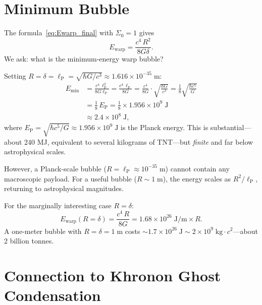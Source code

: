 \documentclass[prd,twocolumn,superscriptaddress,longbibliography]{revtex4-2}
\newcommand{\lP}{\ell_{\mathrm{P}}}
\newcommand{\Emin}{E_{\mathrm{min}}}
\newcommand{\Ewarp}{E_{\mathrm{warp}}}
\begin{document}
\section{Minimum Bubble}
\label{sec:minimum}

The formula~\eqref{eq:Ewarp_final} with $\Sigma_0 = 1$ gives
\begin{equation}
\Ewarp = \frac{c^4\,R^2}{8G\delta}.
\label{eq:Ewarp_simple}
\end{equation}
We ask: what is the minimum-energy warp bubble?

Setting $R = \delta = \lP = \sqrt{\hbar G/c^3}
\approx 1.616\times 10^{-35}\;\mathrm{m}$:
\begin{align}
\Emin &= \frac{c^4\,\lP^2}{8G\lP} = \frac{c^4\,\lP}{8G}
= \frac{c^4}{8G}\cdot\sqrt{\frac{\hbar G}{c^3}}
= \frac{1}{8}\sqrt{\frac{\hbar c^5}{G}}
\nonumber\\
&= \frac{1}{8}\,E_{\mathrm{P}}
= \frac{1}{8}\times 1.956\times 10^{9}\;\mathrm{J}
\nonumber\\
&\approx 2.4\times 10^{8}\;\mathrm{J},
\label{eq:Emin}
\end{align}
where $E_{\mathrm{P}} = \sqrt{\hbar c^5/G} \approx 1.956\times 10^9\;\mathrm{J}$
is the Planck energy.  This is substantial---about 240 MJ, equivalent to
several kilograms of TNT---but \emph{finite} and far below astrophysical
scales.

However, a Planck-scale bubble ($R = \lP \approx 10^{-35}\;\mathrm{m}$)
cannot contain any macroscopic payload.  For a useful bubble
($R \sim 1\;\mathrm{m}$), the energy scales as $R^2/\lP$, returning
to astrophysical magnitudes.

For the marginally interesting case $R = \delta$:
\begin{equation}
\Ewarp(R = \delta) = \frac{c^4\,R}{8G}
= 1.68\times 10^{26}\;\mathrm{J/m}\times R.
\end{equation}
A one-meter bubble with $R = \delta = 1\;\mathrm{m}$ costs
$\sim 1.7\times 10^{26}\;\mathrm{J} \sim 2\times 10^{9}\;\mathrm{kg}\cdot c^2$---about
2 billion tonnes.

\section{Connection to Khronon Ghost Condensation}
\label{sec:khronon}
\end{document}
